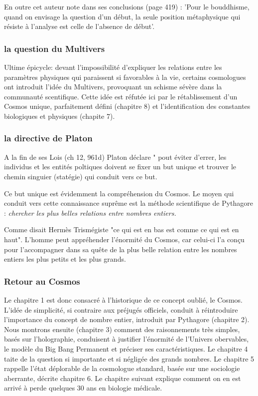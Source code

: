 \documentclass[a4paper,12pt]{article}
\begin{document}
    
    En outre cet auteur note dans ses conclusions (page 419) : 'Pour le bouddhisme, quand on envisage la question d'un début, la seule position métaphysique qui résiste à l'analyse est celle de l'absence de début'.
    
   
   
 \subsubsection{la question du Multivers} 
Ultime épicycle: devant l'impossibilité d'expliquer les relations entre les paramètres physiques qui paraissent si favorables à la vie, certains cosmologues ont introduit l'idée du Multivers, provoquant un schisme sévère dans la communauté scentifique. Cette idée est réfutée ici par le rétablissement d'un Cosmos unique, parfaitement défini (chapitre 8) et l'identification des constantes biologiques et physiques (chapite 7).
 
 
  \subsubsection{la directive de Platon}

A la fin de ses Lois (ch 12, 961d) Platon déclare " pout éviter d'errer, les individus et les entités poltiques doivent se fixer un but unique et trouver le chemin singuier (statégie) qui conduit vers ce but.

Ce but unique est évidemment la compréhension du Cosmos. Le moyen qui conduit vers cette connaissance supr\^eme est la méthode scientifique de Pythagore : \textit {chercher les plus belles relations entre nombres entiers.}

Comme disait Hermès Trismégiste "ce qui est en bas est comme ce qui est en haut". L'homme peut appréhender l'énormité du Cosmos, car celui-ci l'a conçu pour l'accompagner dans sa qu\^ete de la plus belle relation entre les nombres entiers les plus petits et les plus grands.

      
    

\subsubsection{Retour au Cosmos}
Le chapitre 1 est donc consacré à l'historique de ce concept oublié, le Cosmos. L'idée de simplicité, si contraire aux préjugés officiels, conduit à réintroduire l'importance du concept de nombre entier, introduit par Pythagore (chapitre 2). Nous montrons ensuite (chapitre 3) comment des raisonnements très simples, basés sur l'holographie, conduisent à justifier l'énormité de l'Univers obervables, le modèle du Big Bang Permanent et préciser ses caractéristiques. Le chapitre 4 taite de la question si importante et si négligée des grands nombres. Le chapitre 5 rappelle l'état déplorable de la cosmologue standard, basée sur une sociologie aberrante, décrite chapitre 6. Le chapitre suivant explique comment on en est arrivé à perde quelques 30 ans en biologie médicale.
\end{document}
